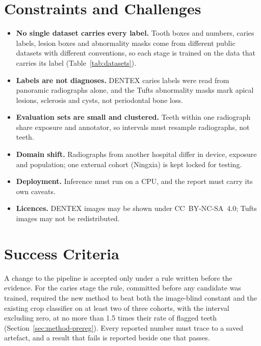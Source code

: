 \section{Constraints and Challenges}

\begin{itemize}
\item \textbf{No single dataset carries every label.} Tooth boxes and numbers, caries labels,
  lesion boxes and abnormality masks come from different public datasets with different conventions,
  so each stage is trained on the data that carries its label (Table~\ref{tab:datasets}).
\item \textbf{Labels are not diagnoses.} DENTEX caries labels were read from panoramic radiographs
  alone, and the Tufts abnormality masks mark apical lesions, sclerosis and cysts, not periodontal
  bone loss.
\item \textbf{Evaluation sets are small and clustered.} Teeth within one radiograph share exposure
  and annotator, so intervals must resample radiographs, not teeth.
\item \textbf{Domain shift.} Radiographs from another hospital differ in device, exposure and
  population; one external cohort (Ningxia) is kept locked for testing.
\item \textbf{Deployment.} Inference must run on a CPU, and the report must carry its own caveats.
\item \textbf{Licences.} DENTEX images may be shown under CC~BY-NC-SA~4.0; Tufts images may not be
  redistributed.
\end{itemize}

\section{Success Criteria}

A change to the pipeline is accepted only under a rule written before the evidence. For the caries
stage the rule, committed before any candidate was trained, required the new method to beat both
the image-blind constant and the existing crop classifier on at least two of three cohorts, with the
interval excluding zero, at no more than 1.5 times their rate of flagged teeth
(Section~\ref{sec:method-prereg}). %
Every reported number must trace to a saved artefact, and a
result that fails is reported beside one that passes.

